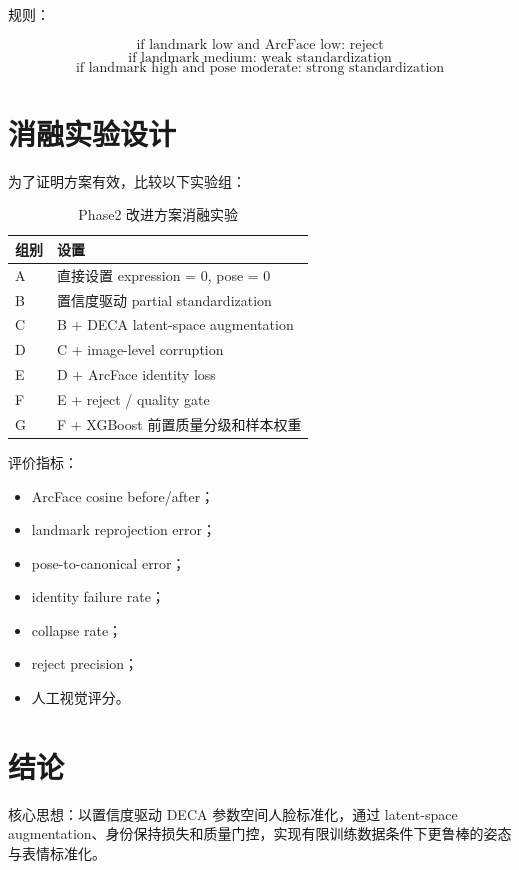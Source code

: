 \documentclass[UTF8,12pt,fontset=fandol]{ctexart}
\begin{document}
规则：

\[
\text{if landmark low and ArcFace low: reject}
\]
\[
\text{if landmark medium: weak standardization}
\]
\[
\text{if landmark high and pose moderate: strong standardization}
\]

\section{消融实验设计}

为了证明方案有效，比较以下实验组：

\begin{table}[h]
\centering
\begin{tabular}{ll}
\toprule
组别 & 设置 \\
\midrule
A & 直接设置 expression = 0, pose = 0 \\
B & 置信度驱动 partial standardization \\
C & B + DECA latent-space augmentation \\
D & C + image-level corruption \\
E & D + ArcFace identity loss \\
F & E + reject / quality gate \\
G & F + XGBoost 前置质量分级和样本权重 \\
\bottomrule
\end{tabular}
\caption{Phase2 改进方案消融实验}
\end{table}

评价指标：

\begin{itemize}
    \item ArcFace cosine before/after；
    \item landmark reprojection error；
    \item pose-to-canonical error；
    \item identity failure rate；
    \item collapse rate；
    \item reject precision；
    \item 人工视觉评分。
\end{itemize}

\section{结论}


核心思想：以置信度驱动 DECA 参数空间人脸标准化，通过 latent-space augmentation、身份保持损失和质量门控，实现有限训练数据条件下更鲁棒的姿态与表情标准化。
\end{document}
